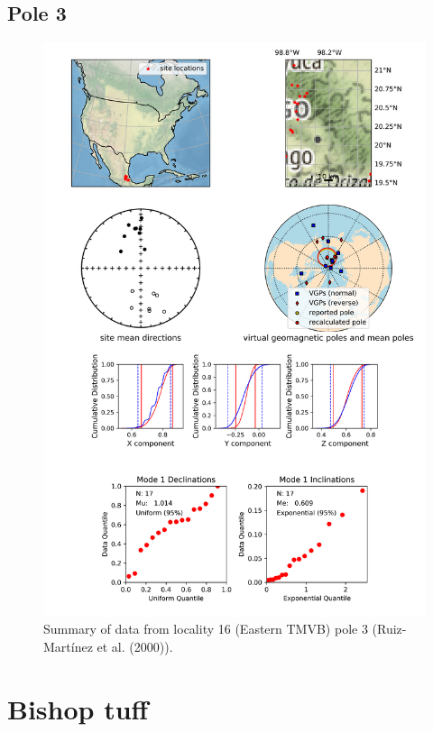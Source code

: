 \subsection{Pole 3}


\begin{figure}[H]
\centering
\includegraphics[width=5 in]{./16/3/pole_summary.png}
\caption{Summary of data from locality 16 (Eastern TMVB) pole 3 (Ruiz-Martínez et al. (2000)).}
\end{figure}

\section{Bishop tuff}
